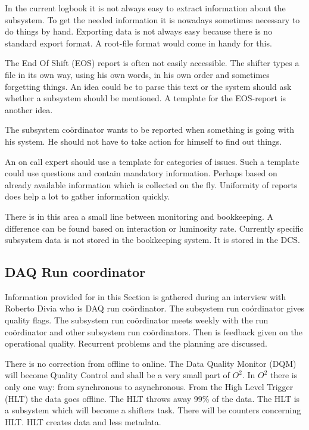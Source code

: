 In the current logbook it is not always easy to extract information about the subsystem. To get the needed information it is nowadays sometimes necessary to do things by hand. Exporting data is not always easy because there is no standard export format. A root-file format would come in handy for this.

The End Of Shift (EOS) report is often not easily accessible. The shifter types a file in its own way, using his own words, in his own order and sometimes forgetting things. An idea could be to parse this text or the system should ask whether a subsystem should be mentioned. A template for the EOS-report is another idea.

The subsystem co\"ordinator wants to be reported when something is going with his system. He should not have to take action for himself to find out things.

An on call expert should use a template for categories of issues. Such a template could use questions and contain mandatory information. Perhaps based on already available information which is collected on the fly. Uniformity of reports does help a lot to gather information quickly.

There is in this area a small line between monitoring and bookkeeping. A difference can be found based on interaction or luminosity rate. Currently specific subsystem data is not stored in the bookkeeping system. It is stored in the DCS.



\subsection{DAQ Run coordinator}
Information provided for in this Section is gathered during an interview with Roberto Divia who is DAQ run co\"ordinator. The subsystem run co\'ordinator gives quality flags. The subsystem run co\"ordinator meets weekly with the run co\"ordinator and other subsystem run co\"ordinators. Then is feedback given on the operational quality. Recurrent problems and the planning are discussed.

There is no correction from offline to online. The Data Quality Monitor (DQM) will become Quality Control and shall be a very small part of $O^2$. In $O^2$ there is only one way: from synchronous to asynchronous. From the High Level Trigger (HLT) the data goes offline. The HLT throws away 99\% of the data. The HLT is a subsystem which will become a shifters task. There will be counters concerning HLT. HLT creates data and less metadata. 

